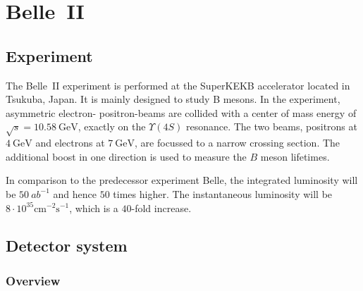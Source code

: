 \chapter{Belle~\RN{2}}
\label{chap:belle2_experiment}

\section{Experiment}
\label{sec:experimental}

The Belle~\RN{2} experiment is performed at the SuperKEKB accelerator located in Tsukuba, Japan. It is mainly designed to study B mesons.
In the experiment, asymmetric electron- positron-beams are collided with a center of mass energy of $\sqrt{s} = 10.58 \mathrm{~GeV}$, exactly on the $\Upsilon (4S)$ resonance. The two beams, positrons at $4 \mathrm{~GeV}$ and electrons at $7 \mathrm{~GeV}$, are focussed to a narrow crossing section. The additional boost in one direction is used to measure the $B$ meson lifetimes.

In comparison to the predecessor experiment Belle, the integrated luminosity will be $50~{ab}^{-1}$ and hence $50$ times higher. The instantaneous luminosity will be $8 \cdot 10^{35} \mathrm{cm}^{-2} \mathrm{s}^{-1}$, which is a $40$-fold increase.

\section{Detector system}
\label{sec:detector_system}

\subsection{Overview}
\label{sec:detector_system_overview}

